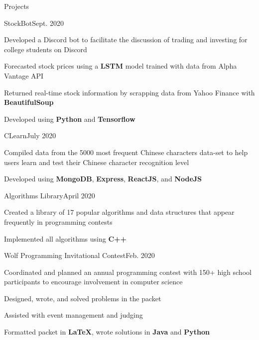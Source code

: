 \documentclass{resume} %
\begin{document}
\begin{rSection}{Projects}
\begin{rSubsection}{StockBot}{Sept. 2020}{}{}
    \item Developed a Discord bot to facilitate the discussion of trading and investing for college students on Discord
    \item Forecasted stock prices using a \textbf{LSTM} model trained with data from Alpha Vantage API
    \item Returned real-time stock information by scrapping data from Yahoo Finance with \textbf{BeautifulSoup}
    \item Developed using \textbf{Python} and \textbf{Tensorflow}
\end{rSubsection}

\begin{rSubsection}{CLearn}{July 2020}{}{}
    \item Compiled data from the 5000 most frequent Chinese characters data-set to help users learn and test their Chinese character recognition level
    \item Developed using \textbf{MongoDB}, \textbf{Express}, \textbf{ReactJS}, and \textbf{NodeJS}
\end{rSubsection}

\begin{rSubsection}{Algorithms Library}{April 2020}{}{}
    \item Created a library of 17 popular algorithms and data structures that appear frequently in programming contests
    \item Implemented all algorithms using \textbf{C++}
\end{rSubsection}

\begin{rSubsection}{Wolf Programming Invitational Contest}{Feb. 2020}{}{}
    \item Coordinated and planned an annual programming contest with 150+ high school participants to encourage involvement in computer science
    \item Designed, wrote, and solved problems in the packet
    \item Assisted with event management and judging
    \item Formatted packet in \textbf{LaTeX}, wrote solutions in \textbf{Java} and \textbf{Python}
\end{rSubsection}
\end{rSection}


\end{document}
